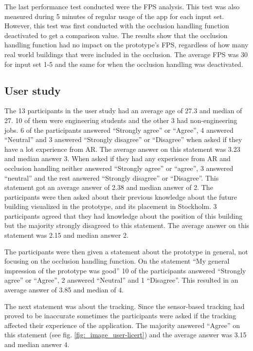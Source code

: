 The last performance test conducted were the FPS analysis. This test was also measured during 5 minutes of regular usage of the app for each input set. However, this test was first conducted with the occlusion handling function deactivated to get a comparison value. The results show that the occlusion handling function had no impact on the prototype's FPS, regardless of how many real world buildings that were included in the occlusion. The average FPS was 30 for input set 1-5 and the same for when the occlusion handling was deactivated.

\subsection{User study}

The 13 participants in the user study had an average age of 27.3 and median of 27. 10 of them were engineering students and the other 3 had non-engineering jobs. 6 of the participants answered ``Strongly agree'' or ``Agree'', 4 answered ``Neutral'' and 3 answered ``Strongly disagree'' or ``Disagree'' when asked if they have a lot experience from AR. The average answer on this statement was 3.23 and median answer 3. When asked if they had any experience from AR and occlusion handling neither answered ``Strongly agree'' or ``agree'', 3 answered ``neutral'' and the rest answered ``Strongly disagree'' or ``Disagree''. This statement got an average answer of 2.38 and median answer of 2. The participants were then asked about their previous knowledge about the future building visualized in the prototype, and its placement in Stockholm. 3 participants agreed that they had knowledge about the position of this building but the majority strongly disagreed to this statement. The average answer on this statement was 2.15 and median answer 2.

The participants were then given a statement about the prototype in general, not focusing on the occlusion handling function. On the statement ``My general impression of the prototype was good'' 10 of the participants answered ``Strongly agree'' or ``Agree'', 2 answered ``Neutral'' and 1 ``Disagree''. This resulted in an average answer of 3.85 and median of 4. 

The next statement was about the tracking. Since the sensor-based tracking had proved to be inaccurate sometimes the participants were asked if the tracking affected their experience of the application. The majority answered ``Agree'' on this statement (see fig. \ref{fig:_image_user-licert}) and the average answer was 3.15 and median answer 4.


